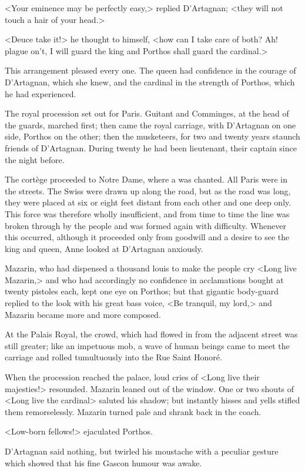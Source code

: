 <Your eminence may be perfectly easy,> replied D'Artagnan; <they will not touch a hair of your head.>

<Deuce take it!> he thought to himself, <how can I take care of both? Ah! plague on't, I will guard the king and Porthos shall guard the cardinal.>

This arrangement pleased every one. The queen had confidence in the courage of D'Artagnan, which she knew, and the cardinal in the strength of Porthos, which he had experienced.

The royal procession set out for Paris. Guitant and Comminges, at the head of the guards, marched first; then came the royal carriage, with D'Artagnan on one side, Porthos on the other; then the musketeers, for two and twenty years staunch friends of D'Artagnan. During twenty he had been lieutenant, their captain since the night before.

The cortège proceeded to Notre Dame, where a  was chanted. All Paris were in the streets. The Swiss were drawn up along the road, but as the road was long, they were placed at six or eight feet distant from each other and one deep only. This force was therefore wholly insufficient, and from time to time the line was broken through by the people and was formed again with difficulty. Whenever this occurred, although it proceeded only from goodwill and a desire to see the king and queen, Anne looked at D'Artagnan anxiously.

Mazarin, who had dispensed a thousand louis to make the people cry <Long live Mazarin,> and who had accordingly no confidence in acclamations bought at twenty pistoles each, kept one eye on Porthos; but that gigantic body-guard replied to the look with his great bass voice, <Be tranquil, my lord,> and Mazarin became more and more composed.

At the Palais Royal, the crowd, which had flowed in from the adjacent street was still greater; like an impetuous mob, a wave of human beings came to meet the carriage and rolled tumultuously into the Rue Saint Honoré.

When the procession reached the palace, loud cries of <Long live their majesties!> resounded. Mazarin leaned out of the window. One or two shouts of <Long live the cardinal> saluted his shadow; but instantly hisses and yells stifled them remorselessly. Mazarin turned pale and shrank back in the coach.

<Low-born fellows!> ejaculated Porthos.

D'Artagnan said nothing, but twirled his moustache with a peculiar gesture which showed that his fine Gascon humour was awake.

